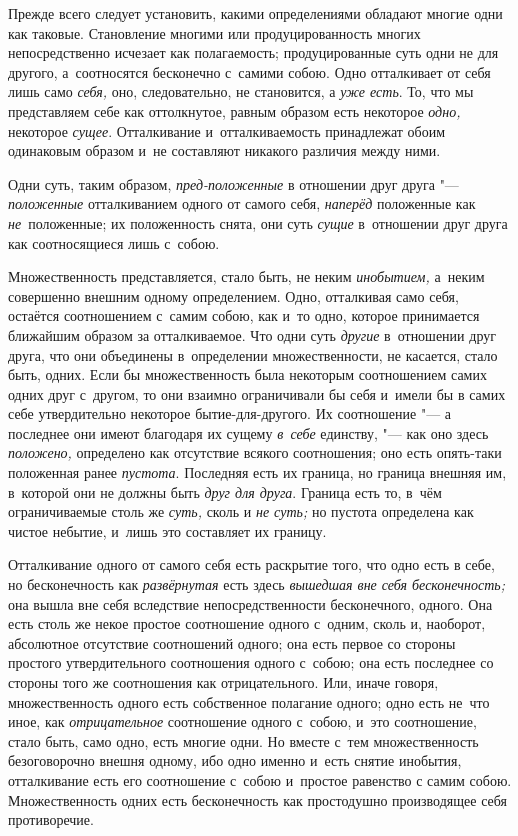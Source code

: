 Прежде всего следует установить, какими определениями обладают многие одни
как таковые. Становление многими или продуцированность многих
непосредственно исчезает как полагаемость; продуцированные суть одни не для
другого, а~соотносятся бесконечно с~самими собою. Одно отталкивает от себя
лишь само {\em себя,} оно, следовательно, не
становится, а {\em уже есть}. То, что мы представляем
себе как оттолкнутое, равным образом есть некоторое
{\em одно,} некоторое {\em сущее}.
Отталкивание и~отталкиваемость принадлежат обоим одинаковым образом и~не
составляют никакого различия между ними.

Одни суть, таким образом, {\em пред-положенные} в
отношении друг друга "--- {\em положенные} отталкиванием
одного от самого себя, {\em наперёд} положенные как
{\em не}~положенные; их положенность снята, они суть
{\em сущие} в~отношении друг друга как соотносящиеся лишь с~собою.

Множественность представляется, стало быть, не неким
{\em инобытием,} а~неким совершенно внешним одному
определением. Одно, отталкивая само себя, остаётся соотношением с~самим
собою, как и~то одно, которое принимается ближайшим образом за
отталкиваемое. Что одни суть {\em другие} в~отношении
друг друга, что они объединены в~определении множественности, не касается,
стало быть, одних. Если бы множественность была некоторым соотношением
самих одних друг с~другом, то они взаимно ограничивали бы себя и~имели бы в
самих себе утвердительно некоторое бытие-для-другого. Их соотношение "--- а
последнее они имеют благодаря их сущему {\em в~себе}
единству, "--- как оно здесь {\em положено,} определено
как отсутствие всякого соотношения; оно есть опять-таки положенная ранее
{\em пустота}. Последняя есть их граница, но граница
внешняя им, в~которой они не должны быть {\em друг для
друга}. Граница есть то, в~чём ограничиваемые столь же
{\em суть,} сколь и {\em не суть;}
но пустота определена как чистое небытие, и~лишь это составляет их границу.

Отталкивание одного от самого себя есть раскрытие того, что одно есть в
себе, но бесконечность как {\em развёрнутая} есть здесь
{\em вышедшая вне себя бесконечность;} она вышла вне
себя вследствие непосредственности бесконечного, одного. Она есть столь же
некое простое соотношение одного с~одним, сколь и, наоборот, абсолютное
отсутствие соотношений одного; она есть первое со стороны простого
утвердительного соотношения одного с~собою; она есть последнее со стороны
того же соотношения как отрицательного. Или, иначе говоря, множественность
одного есть собственное полагание одного; одно есть не~что иное, как
{\em отрицательное} соотношение одного с~собою, и~это
соотношение, стало быть, само одно, есть многие одни. Но вместе с~тем
множественность безоговорочно внешня одному, ибо одно именно и~есть снятие
инобытия, отталкивание есть его соотношение с~собою и~простое равенство с
самим собою. Множественность одних есть бесконечность как простодушно
производящее себя противоречие.

